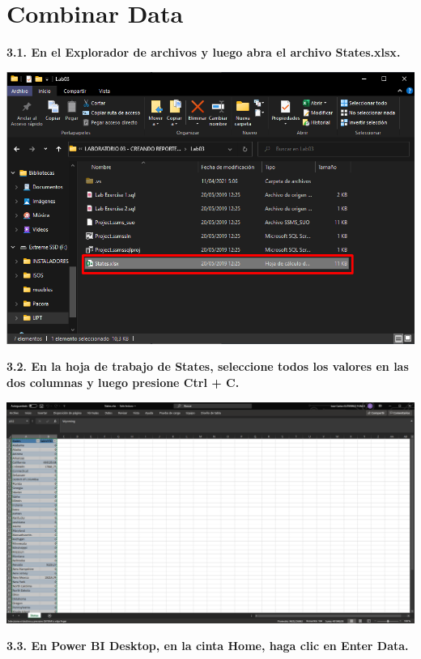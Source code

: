 \documentclass{article}
\begin{document}
	
	
	
\newpage
\section{Combinar Data}

\textbf{3.1. En el \textbf{Explorador de archivos} y luego abra el archivo \textbf{States.xlsx}.}

    \begin{center}
		\includegraphics[width=14cm]{./images/48} 
	\end{center}
\newpage
\textbf{3.2. En la hoja de trabajo de \textbf{States}, seleccione todos los valores en las dos columnas y luego presione Ctrl + C.}

    \begin{center}
		\includegraphics[width=14cm]{./images/49} 
	\end{center}

\textbf{3.3. En Power BI Desktop, en la cinta \textbf{Home}, haga clic en Enter Data.}
\end{document}
